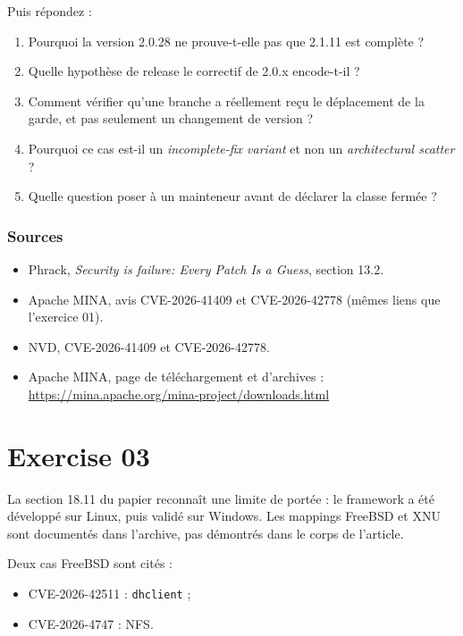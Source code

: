 \documentclass{training}
\begin{document}
Puis répondez :

\begin{enumerate}
  \item Pourquoi la version 2.0.28 ne prouve-t-elle pas que 2.1.11 est
        complète ?
  \item Quelle hypothèse de release le correctif de 2.0.x encode-t-il ?
  \item Comment vérifier qu'une branche a réellement reçu le déplacement de
        la garde, et pas seulement un changement de version ?
  \item Pourquoi ce cas est-il un \emph{incomplete-fix variant} et non un
        \emph{architectural scatter} ?
  \item Quelle question poser à un mainteneur avant de déclarer la classe
        fermée ?
\end{enumerate}

\subsection*{Sources}
\begin{itemize}
  \item Phrack, \emph{Security is failure: Every Patch Is a Guess},
        section 13.2.
  \item Apache MINA, avis CVE-2026-41409 et CVE-2026-42778 (mêmes liens que
        l'exercice 01).
  \item NVD, CVE-2026-41409 et CVE-2026-42778.
  \item Apache MINA, page de téléchargement et d'archives :
        \url{https://mina.apache.org/mina-project/downloads.html}
\end{itemize}

\chapter{Exercise 03}
\makeheaderfiles

La section 18.11 du papier reconnaît une limite de portée : le framework a
été développé sur Linux, puis validé sur Windows. Les mappings FreeBSD et
XNU sont documentés dans l'archive, pas démontrés dans le corps de
l'article.

Deux cas FreeBSD sont cités :

\begin{itemize}
  \item CVE-2026-42511 : \texttt{dhclient} ;
  \item CVE-2026-4747 : NFS.
\end{itemize}
\end{document}
